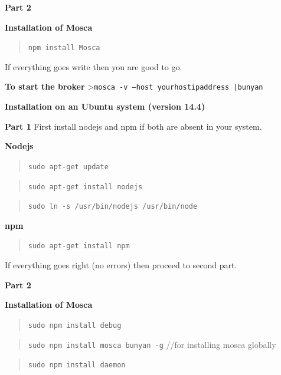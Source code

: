\documentclass[16pt]{article}
\begin{document}
\textbf{Part 2}

\textbf{Installation of Mosca}

\begin{quote}
	\texttt{npm install Mosca}
\end{quote}

If everything goes write then you are good to go.
\vspace{0.5cm}

\textbf{To start the broker} \textgreater{}\texttt{mosca -v --host yourhostipaddress |bunyan}


\textbf{Installation on an Ubuntu system (version
	14.4)}

\textbf{Part 1} First install nodejs and npm if both are absent in your
system.

\textbf{Nodejs}

\begin{quote}
	\texttt{sudo apt-get update}
\end{quote}

\begin{quote}
	\texttt{sudo apt-get install nodejs}
\end{quote}

\begin{quote}
	\texttt{sudo ln -s /usr/bin/nodejs /usr/bin/node}
\end{quote}

\textbf{npm}

\begin{quote}
	\texttt{sudo apt-get install npm}
\end{quote}

If everything goes right (no errors) then proceed to second part.

\vspace{0.3cm}

\textbf{Part 2}

\textbf{Installation of Mosca}

\begin{quote}
	\texttt{sudo npm install debug}
\end{quote}

\begin{quote}
	\texttt{sudo npm install mosca bunyan -g} //for installing mosca
	globally
\end{quote}

\begin{quote}
	\texttt{sudo npm install daemon}
\end{quote}
\end{document}
